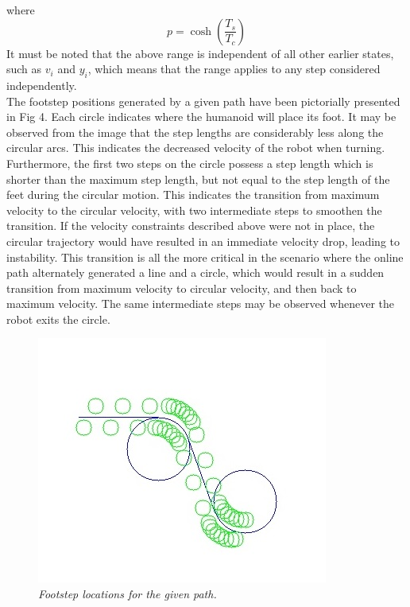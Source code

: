\documentclass[letterpaper, 10 pt, conference]{ieeeconf}  %
\begin{document}
  where \begin{equation}
 p=\cosh\left(\frac{T_s}{T_c}\right)
 \end{equation}
It must be noted that the above range is independent of all other earlier states, such as $v_i$ and $y_i$, which means that the range applies to any step considered independently.\\
The footstep positions generated by a given path have been pictorially presented in Fig 4. Each circle indicates where the humanoid will place its foot. It may be observed from the image that the step lengths are considerably less along the circular arcs. This indicates the decreased velocity of the robot when turning. Furthermore, the first two steps on the circle possess a step length which is shorter than the maximum step length, but not equal to the step length of the feet during the circular motion. This indicates the transition from maximum velocity to the circular velocity, with two intermediate steps to smoothen the transition. If the velocity constraints described above were not in place, the circular trajectory would have resulted in an immediate velocity drop, leading to instability. This transition is all the more critical in the scenario where the online path alternately generated a line and a circle, which would result in a sudden transition from maximum velocity to circular velocity, and then back to maximum velocity. The same intermediate steps may be observed whenever the robot exits the circle.
\begin{figure}[h]  
\begin{center}  
\includegraphics[scale=01.0]{footstep.jpg}  
\caption{\small \sl Footstep locations for the given path.\label{fig:footstep}}  
\end{center}  
\end{figure}
\end{document}

